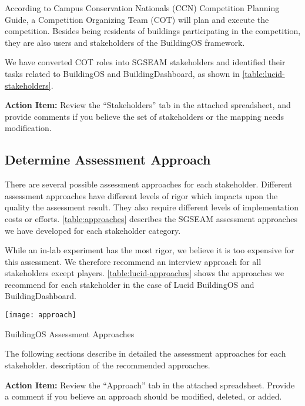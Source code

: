 According to Campus Conservation Nationals (CCN) Competition Planning
Guide, a Competition Organizing Team (COT) will plan and
execute the competition. Besides being residents of buildings
participating in the competition, they are also users and stakeholders
of the BuildingOS framework. 

We have converted COT roles into SGSEAM stakeholders and identified their tasks related to BuildingOS and
BuildingDashboard, as shown in
\autoref{table:lucid-stakeholders}. 

\begin{shadebox}
{\bf Action Item:} Review the ``Stakeholders'' tab in the
attached spreadsheet, and provide comments if you believe the set of
stakeholders or the mapping needs modification.
\end{shadebox}


\subsection{Determine Assessment Approach}
\label{sect:Assessment Approach}

There are several possible assessment approaches for each
stakeholder. Different assessment approaches have different levels of
rigor which impacts upon the quality the assessment
result. They also require different levels of 
implementation costs or efforts. \autoref{table:approaches}
describes the SGSEAM assessment approaches we have developed for each
stakeholder category.

While an in-lab experiment has the most rigor, we believe it is too
expensive for this assessment. We therefore recommend an
interview approach for all stakeholders except
players. \autoref{table:lucid-approaches} shows the approaches we recommend
for each stakeholder in the case of Lucid BuildingOS and BuildingDashboard.
 
\begin{table}[ht!]
  \center
  \texttt{[image: approach]}
  \caption{BuildingOS Assessment Approaches}
  \label{table:lucid-approaches}
\end{table}


The following sections describe in detailed the assessment approaches for each stakeholder.
description of the recommended approaches.

\begin{shadebox}
{\bf Action Item:} Review the ``Approach'' tab in the attached
spreadsheet.  Provide a comment if you believe an approach should be
modified, deleted, or added.
\end{shadebox}

